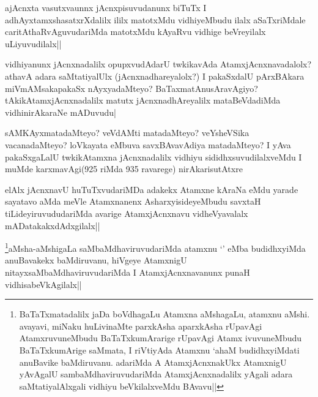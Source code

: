 
\begin{artha}
ajAcnxta vasutxvaunnx jAcnxpisuvudanunx biTuTx I adhAyxtamxshasatxrXdalilx ililx matotxMdu vidhiyeMbudu ilalx aSaTxriMdale caritAthaRvAguvudariMda matotxMdu kAyaRvu vidhige beVreyilalx uLiyuvudilalx||
\end{artha}

\begin{artha}
vidhiyanunx jAcnxnadalilx opupxvudAdarU twkikavAda AtamxjAcnxnavadalolx? athavA adara saMtatiyalUlx (jAcnxnadhareyalolx?) I pakaSxdalU pArxBAkara miVmAMsakapakaSx nAyxyadaMteyo? BaTaxmatAnusAravAgiyo?tAkikAtamxjAcnxnadalilx matutx jAcnxnadhAreyalilx mataBeVdadiMda vidhinirAkaraNe mADuvudu|
\end{artha}

\begin{artha}
sAMKAyxmatadaMteyo? veVdAMti matadaMteyo? veYsheVSika vacanadaMteyo? loVkayata eMbuva savxBAvavAdiya matadaMteyo? I yAva pakaSxgaLalU twkikAtamxna jAcnxnadalilx vidhiyu sididhxsuvudilalxveMdu I muMde karxmavAgi(925 riMda 935 ravarege) nirAkarisutAtxre
\end{artha}


\begin{artha}
elAlx jAcnxnavU huTuTxvudariMDa adakekx Atamxne kAraNa eMdu yarade sayatavo aMda meVle Atamxnanenx AsharxyisideyeMbudu savxtaH tiLideyiruvududariMda avarige AtamxjAcnxnavu vidheVyavalalx mADatakakxdAdxgilalx||
\end{artha}


\begin{artha}
\footnote{BaTaTxmatadalilx jaDa boVdhagaLu Atamxna aMshagaLu, atamxnu aMshi. avayavi, miNaku huLivinaMte parxkAsha aparxkAsha rUpavAgi AtamxruvuneMbudu BaTaTxkumArarige rUpavAgi Atamx ivuvuneMbudu BaTaTxkumArige saMmata, I riVtiyAda Atamxnu `ahaM budidhxyiMdati anuBavike baMdiruvanu. adariMda A AtamxjAcnxnakUkx AtamxnigU yAvAgalU sambaMdhaviruvudariMda AtamxjAcnxnadalilx yAgali adara saMtatiyalAlxgali vidhiyu beVkilalxveMdu BAvavu||}aMsha-aMshigaLa saMbaMdhaviruvudariMda atamxnu `\stext' eMba budidhxyiMda anuBavakekx baMdiruvanu, hiVgeye AtamxnigU nitayxsaMbaMdhaviruvudariMda I AtamxjAcnxnavanunx punaH vidhisabeVkAgilalx||
\end{artha}

